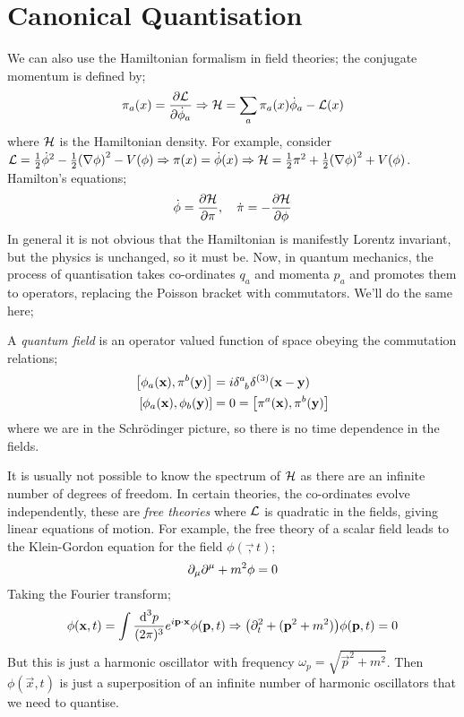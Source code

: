 \section{Canonical Quantisation}
We can also use the Hamiltonian formalism in field theories; the conjugate momentum is defined by;
\begin{equation}
\pi_a (x) = \frac{\partial \mathcal{L}}{\partial \dot{\phi}_a} \Rightarrow \mathcal{H} = \sum_{a}{\pi_a (x) \dot{\phi}_a} - \mathcal{L}(x)
\end{equation}
where $\mathcal{H}$ is the Hamiltonian density. For example, consider $\mL = \tfrac{1}{2} \dot{\phi}^2 - \tfrac{1}{2} \left(\nabla \phi \right)^2 - V(\phi) \Rightarrow \pi(x) = \dot{\phi}(x) \Rightarrow \hamilt = \tfrac{1}{2} \pi^2 + \tfrac{1}{2} \left(\nabla \phi \right)^2 + V(\phi)$. Hamilton's equations;
\begin{equation}
\dot{\phi} = \frac{\partial \mathcal{H}}{\partial \pi}, \quad \dot{\pi} = - \frac{\partial \mathcal{H}}{\partial \phi}
\end{equation}
In general it is not obvious that the Hamiltonian is manifestly Lorentz invariant, but the physics is unchanged, so it must be. Now, in quantum mechanics, the process of quantisation takes co-ordinates $q_a$ and momenta $p_a$ and promotes them to operators, replacing the Poisson bracket with commutators. We'll do the same here;
\begin{definitionbox}
A \emph{quantum field} is an operator valued function of space obeying the commutation relations;
\begin{align}
\left[\phi_a(\vec x), \pi^b(\vec y)\right] &= i\delta\indices{^{a}_{b}}\delta^{(3)}(\vec x - \vec y) \\
\left[\phi_a(\vec x), \phi_b(\vec y)\right] &= 0 = \left[\pi^{a}(\vec x), \pi^{b}(\vec y)\right] 
\end{align}
where we are in the Schr{\"o}dinger picture, so there is no time dependence in the fields.
\end{definitionbox}
It is usually not possible to know the spectrum of $\mathcal{H}$ as there are an infinite number of degrees of freedom. In certain theories, the co-ordinates evolve independently, these are \emph{free theories} where $\mathcal{L}$ is quadratic in the fields, giving linear equations of motion. For example, the free theory of a scalar field leads to the Klein-Gordon equation for the field $\phi(\vec, t)$;
\begin{equation}
\partial_\mu \partial^\mu + m^2 \phi = 0
\end{equation}
Taking the Fourier transform;
\begin{equation}
\phi(\vec x, t) = \int{\frac{\ud^3 p}{(2\pi)^3} e^{i \vec p \cdot \vec x} \phi(\vec p, t)} \Rightarrow \left(\del^2_t + ( \vec{p}^2 + m^2 )\right) \phi(\vec p, t) = 0
\end{equation}
But this is just a harmonic oscillator with frequency $\omega_{p} = \sqrt{\vec{p}^2 + m^2}$. Then $\phi(\vec x, t)$ is just a superposition of an infinite number of harmonic oscillators that we need to quantise.
